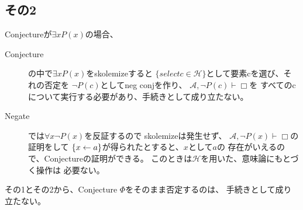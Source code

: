 \documentclass[10pt, onecolumn]{jarticle}   	%
\begin{document}
\subsection{その2}

Conjectureが$\exists x P(x)$の場合、
\begin{description}
\item[Conjecture] の中で$\exists x P(x)$をskolemizeすると
$\{ select c \in \mathcal{H}\}$として要素cを選び、それの否定を
$\neg P(c)$としてneg conjを作り、
$\mathcal{A}, \neg P(c) \vdash \Box$を
すべてのcについて実行する必要があり、手続きとして成り立たない。
\item[Negate]では$\forall x \neg P(x)$を反証するので
skolemizeは発生せず、
$\mathcal{A}, \neg P(x)\vdash \Box$の証明をして
$\{x \leftarrow a\}$が得られたとすると、$x$として$a$の
存在がいえるので、Conjectureの証明ができる。
このときは$\mathcal{H}$を用いた、意味論にもとづく操作は
必要ない。
\end{description}

その1とその2から、Conjecture $\Phi$をそのまま否定するのは、
手続きとして成り立たない。
\end{document}
